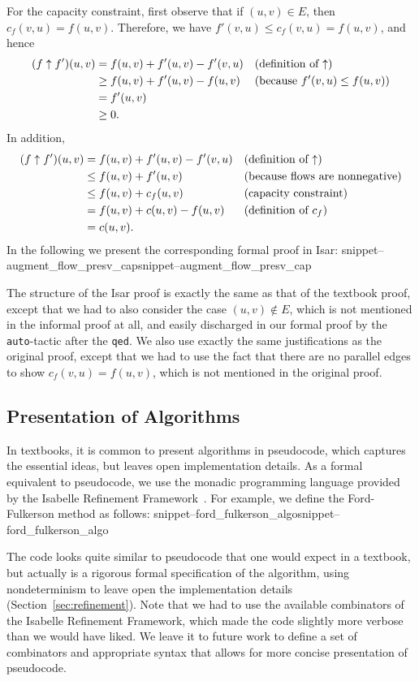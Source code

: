 \documentclass[smallcondensed]{svjour3}     %
\newcommand{\isai}{\lstinline[language=isabelle,basicstyle=\normalsize\ttfamily\slshape]}
\newcommand{\Snippet}[1]{\ifcsname snippet--#1\endcsname\csname snippet--#1\endcsname\else\PackageError{}{No snippet '#1' defined.}{}\fi}
\begin{document}
For the capacity constraint, first observe that if $(u, v) \in E$, then $c_f(v, u) = f(u, v)$. Therefore, we have $f'(v,u) \leq c_f(v, u) = f(u, v)$, and hence
	\begin{align*}
	(f \uparrow f') (u, v) &= f(u, v) + f'(u, v) - f'(v, u)  && \text{(definition of ${\mathbin\uparrow}$)} \\
	& \geq f(u, v) + f'(u, v) - f(u, v) && \text{(because $f'(v,u) \leq f(u, v)$)} \\
	& = f'(u, v) \\
	& \geq 0.
	\end{align*}
In addition,
	\begin{align*}
	(f \uparrow f') (u, v) &= f(u, v) + f'(u, v) - f'(v, u)  && \text{(definition of ${\mathbin\uparrow}$)} \\
	& \leq f(u, v) + f'(u, v) && \text{(because flows are nonnegative)} \\
	& \leq f(u, v) + c_f(u, v) &&  \text{(capacity constraint)} \\
	& = f(u, v) + c(u, v) - f(u, v) && \text{(definition of $c_f$)} \\
	& = c (u, v).
	\end{align*}
% 
In the following we present the corresponding formal proof in Isar:
\Snippet{augment_flow_presv_cap}
The structure of the Isar proof is exactly the same as that of the textbook proof, except that we had to also consider the case $(u,v)\notin E$, which is not mentioned in the informal proof at all, and easily discharged in our formal proof by the \isai{auto}-tactic after the \isai{qed}. We also use exactly the same justifications as the original proof, except that we had to use the fact that there are no parallel edges to show $c_f(v,u)=f(u,v)$, which is not mentioned in the original proof.

\subsection{Presentation of Algorithms}
In textbooks, it is common to present algorithms in pseudocode, which captures the essential ideas, but leaves open implementation details. As a formal equivalent to pseudocode, we use the monadic programming language provided by the Isabelle Refinement Framework~\cite{LaTu12,La12}. For example, we define the Ford-Fulkerson method as follows:
\Snippet{ford_fulkerson_algo}

The code looks quite similar to pseudocode that one would expect in a textbook, but actually is a rigorous formal specification of the algorithm, using nondeterminism to leave open the implementation details (\cf Section~\ref{sec:refinement}). Note that we had to use the available combinators of the Isabelle Refinement Framework, which made the code slightly more verbose than we would have liked. We leave it to future work to define a set of combinators and appropriate syntax that allows for more concise presentation of pseudocode.
\end{document}
